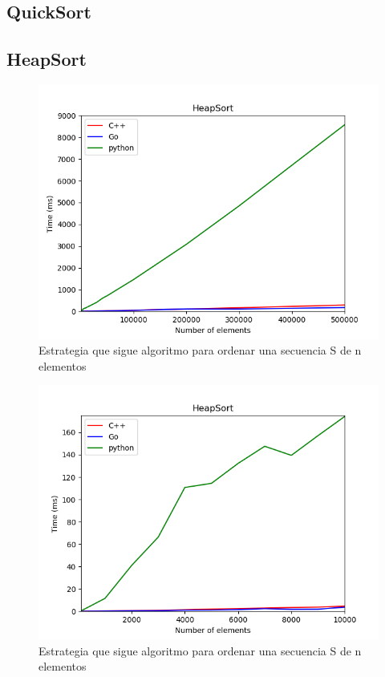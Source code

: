 \documentclass{article}
\begin{document}
    \subsection{QuickSort}

    \subsection{HeapSort}
            \begin{figure}[h!]
            \centering
            \includegraphics[width=12cm]{img/HeapSort_1.png}
            \caption{Estrategia que sigue algoritmo para ordenar una secuencia S de n elementos}
            \label{fig:mergesort}
        \end {figure}
                \begin{figure}[h!]
            \centering
            \includegraphics[width=12cm]{img/HeapSort_2.png}
            \caption{Estrategia que sigue algoritmo para ordenar una secuencia S de n elementos}
            \label{fig:mergesort}
        \end {figure}
\end{document}
